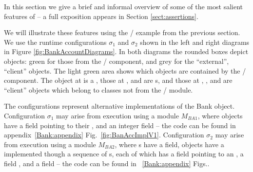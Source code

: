 %
In this section we give a brief and informal  overview of some of the most salient features of  
\Chainmail -- a full exposition appears in Section \ref{sect:assertions}.



 We  will illustrate these features using the  / example from the previous section.
We   use the runtime configurations $\sigma_1$ and $\sigma_2$ 
shown in the left and right diagrams in Figure \ref{fig:BankAccountDiagrams}. 
In both diagrams the rounded boxes depict objects:  green for those from the 
/ component, and grey for the ``external'',  ``client'' objects.
The light green area shows which objects are contained by the / component.
The object at  is a , those at ,  and  are 
s, and those at , ,  and  are 
``client'' objects which belong to classes not from the /  module.

The configurations represent alternative implementations of the Bank object.
Configuration  $\sigma_1$ may arise from execution using a module $M_{BA1}$, where   objects
  have a field  pointing to their , and an integer field  
-- the code can be found in appendix~\ref{Bank:appendix} Fig.~\ref{fig:BanAccImplV1}.
Configuration  $\sigma_2$ may arise from execution using a module $M_{BA2}$,  where s have a 
field,   objects  have a  implemented though a sequence of s, each of which has a
 field pointing to an , a field , and a
 field  -- the code can be found in ~\ref{Bank:appendix}
Figs..

